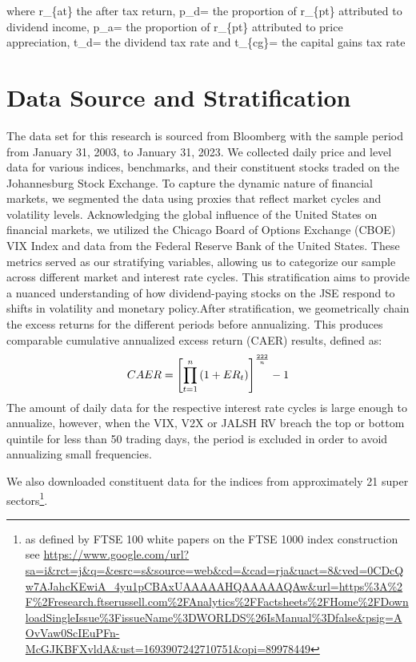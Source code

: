 \documentclass[11pt,preprint, authoryear]{elsarticle}
\numberwithin{equation}{section}
\numberwithin{figure}{section}
\numberwithin{table}{section}
\let\rmarkdownfootnote\footnote%
\def\footnote{\protect\rmarkdownfootnote}
\begin{document}
where r\_\{at\} the after tax return, p\_d= the proportion of r\_\{pt\}
attributed to dividend income, p\_a= the proportion of r\_\{pt\}
attributed to price appreciation, t\_d= the dividend tax rate and
t\_\{cg\}= the capital gains tax rate

\newpage

\hypertarget{data-source-and-stratification}{%
\section{Data Source and
Stratification}\label{data-source-and-stratification}}

The data set for this research is sourced from Bloomberg with the sample
period from January 31, 2003, to January 31, 2023. We collected daily
price and level data for various indices, benchmarks, and their
constituent stocks traded on the Johannesburg Stock Exchange. To capture
the dynamic nature of financial markets, we segmented the data using
proxies that reflect market cycles and volatility levels. Acknowledging
the global influence of the United States on financial markets, we
utilized the Chicago Board of Options Exchange (CBOE) VIX Index and data
from the Federal Reserve Bank of the United States. These metrics served
as our stratifying variables, allowing us to categorize our sample
across different market and interest rate cycles. This stratification
aims to provide a nuanced understanding of how dividend-paying stocks on
the JSE respond to shifts in volatility and monetary policy.After
stratification, we geometrically chain the excess returns for the
different periods before annualizing. This produces comparable
cumulative annualized excess return (CAER) results, defined as:
\begin{align}
C A E R=\left[\prod_{t=1}^n\left(1+E R_t\right)\right]^{\frac{222}{n}}-1 \notag
\end{align} The amount of daily data for the respective interest rate
cycles is large enough to annualize, however, when the VIX, V2X or JALSH
RV breach the top or bottom quintile for less than 50 trading days, the
period is excluded in order to avoid annualizing small frequencies.

We also downloaded constituent data for the indices from approximately
21 super sectors\footnote{as defined by FTSE 100 white papers on the
  FTSE 1000 index construction see
  \url{https://www.google.com/url?sa=i\&rct=j\&q=\&esrc=s\&source=web\&cd=\&cad=rja\&uact=8\&ved=0CDcQw7AJahcKEwiA_4yu1pCBAxUAAAAAHQAAAAAQAw\&url=https\%3A\%2F\%2Fresearch.ftserussell.com\%2FAnalytics\%2FFactsheets\%2FHome\%2FDownloadSingleIssue\%3FissueName\%3DWORLDS\%26IsManual\%3Dfalse\&psig=AOvVaw0ScIEuPFn-McGJKBFXvldA\&ust=1693907242710751\&opi=89978449}}.
\end{document}
